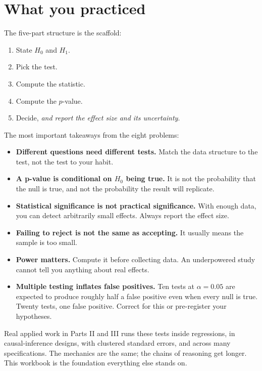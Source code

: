 \documentclass[
  letterpaper,
  11pt,
  twoside,
  openany]{scrbook}
\providecommand{\tightlist}{%
  \setlength{\itemsep}{0pt}\setlength{\parskip}{0pt}}
\begin{document}
\section{What you practiced}\label{what-you-practiced-2}

The five-part structure is the scaffold:

\begin{enumerate}
\def\labelenumi{\arabic{enumi}.}
\tightlist
\item
  State \(H_0\) and \(H_1\).
\item
  Pick the test.
\item
  Compute the statistic.
\item
  Compute the \(p\)-value.
\item
  Decide, \emph{and report the effect size and its uncertainty}.
\end{enumerate}

The most important takeaways from the eight problems:

\begin{itemize}
\tightlist
\item
  \textbf{Different questions need different tests.} Match the data
  structure to the test, not the test to your habit.
\item
  \textbf{A p-value is conditional on \(H_0\) being true.} It is not the
  probability that the null is true, and not the probability the result
  will replicate.
\item
  \textbf{Statistical significance is not practical significance.} With
  enough data, you can detect arbitrarily small effects. Always report
  the effect size.
\item
  \textbf{Failing to reject is not the same as accepting.} It usually
  means the sample is too small.
\item
  \textbf{Power matters.} Compute it before collecting data. An
  underpowered study cannot tell you anything about real effects.
\item
  \textbf{Multiple testing inflates false positives.} Ten tests at
  \(\alpha = 0.05\) are expected to produce roughly half a false
  positive even when every null is true. Twenty tests, one false
  positive. Correct for this or pre-register your hypotheses.
\end{itemize}

Real applied work in Parts II and III runs these tests inside
regressions, in causal-inference designs, with clustered standard
errors, and across many specifications. The mechanics are the same; the
chains of reasoning get longer. This workbook is the foundation
everything else stands on.
\end{document}
